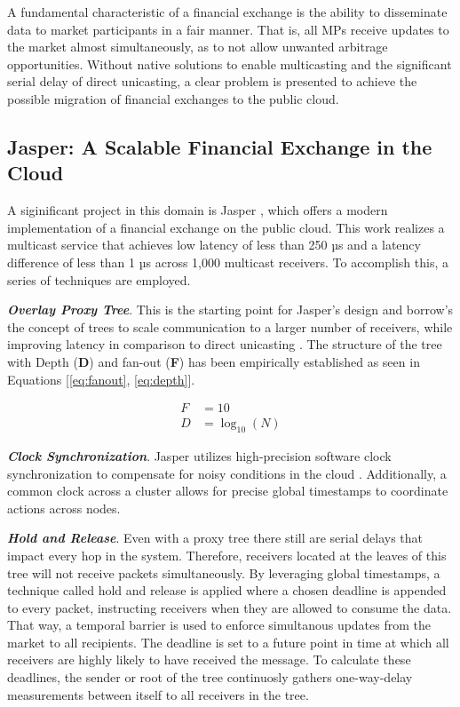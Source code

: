 A fundamental characteristic of a financial exchange is the ability to disseminate data
    to market participants in a fair manner. 
That is, all MPs receive updates to the market almost simultaneously, as to not allow 
    unwanted arbitrage opportunities.
Without native solutions to enable multicasting and the significant serial 
    delay of direct unicasting, a clear problem is presented 
    to achieve the possible migration of financial exchanges to the public cloud.

\subsection{Jasper: A Scalable Financial Exchange in the Cloud}
A siginificant project in this domain is Jasper \cite{jasper}, which offers 
a modern implementation of a financial exchange on the public cloud. 
This work realizes a multicast service that achieves low latency of less than 
250 µs and a latency difference of less than 1 µs across 1,000 multicast receivers.
To accomplish this, a series of techniques are employed.


\textbf{\textit{Overlay Proxy Tree}}. This is the starting point for Jasper's design 
    and borrow's the concept of trees to scale communication to a larger number of 
    receivers, while improving latency in comparison to direct unicasting \cite{matsuoka, twotree}.
    The structure of the tree with Depth (\textbf{D}) and fan-out (\textbf{F}) has been empirically established 
    as seen in Equations [\ref{eq:fanout}, \ref{eq:depth}].

\begin{align}
F &= 10 \label{eq:fanout} \\
D &= \log_{10}{(N)} \label{eq:depth}
\end{align}

\textbf{\textit{Clock Synchronization}}. Jasper utilizes high-precision software clock 
 synchronization to compensate for noisy conditions in the cloud \cite{hyugens}. Additionally, 
 a common clock across a cluster allows for precise global timestamps to coordinate actions 
 across nodes.

\textbf{\textit{Hold and Release}}. Even with a proxy tree there still are serial delays that impact 
every hop in the system. Therefore, receivers located at the leaves of this tree will not receive 
packets simultaneously. By leveraging global timestamps, a technique called hold and release is 
applied where a chosen deadline is appended to every packet, instructing receivers when they are 
allowed to consume the data. That way, a temporal barrier is used to enforce simultanous updates from the 
market to all recipients. The deadline is set to a future point in time at which all receivers are highly likely 
to have received the message. To calculate these deadlines, the sender or root of the tree continuosly gathers
one-way-delay measurements between itself to all receivers in the tree.

